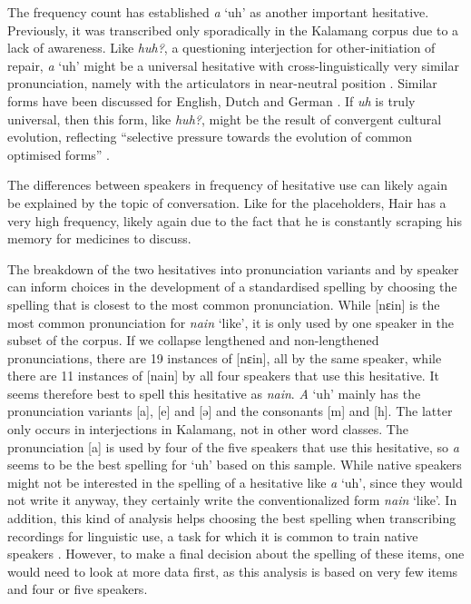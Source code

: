 \documentclass[output=paper,colorlinks,citecolor=brown
\ChapterDOI{10.5281/zenodo.15697587}
]{langscibook}
\begin{document}
The frequency count has established \textit{a} `uh' as another important hesitative. Previously, it was transcribed only sporadically in the Kalamang corpus due to a lack of awareness. Like \textit{huh?}, a questioning interjection for other-initiation of repair, \textit{a} `uh' might be a universal hesitative with cross-linguistically very similar pronunciation, namely with the articulators in near-neutral position \citep{dingemanse2013}. Similar forms have been discussed for English, Dutch and German \citep{clark2002using, leeuw2007hesitation}. If \textit{uh} is truly universal, then this form, like \textit{huh?}, might be the result of convergent cultural evolution, reflecting ``selective pressure towards the evolution of common optimised forms'' \citep[e78273]{dingemanse2013}.

The differences between speakers in frequency of hesitative use can likely again be explained by the topic of conversation. Like for the placeholders, Hair has a very high frequency, likely again due to the fact that he is constantly scraping his memory for medicines to discuss.

The breakdown of the two hesitatives into pronunciation variants and by speaker can inform choices in the development of a standardised spelling by choosing the spelling that is closest to the most common pronunciation. While [nɛin] is the most common pronunciation for \textit{nain} `like', it is only used by one speaker in the subset of the corpus. If we collapse lengthened and non-lengthened pronunciations, there are 19 instances of [nɛin], all by the same speaker, while there are 11 instances of [nain] by all four speakers that use this hesitative. It seems therefore best to spell this hesitative as \textit{nain}. \textit{A} `uh' mainly has the pronunciation variants [a], [e] and [ə] and the consonants [m] and [h]. The latter only occurs in interjections in Kalamang, not in other word classes. The pronunciation [a] is used by four of the five speakers that use this hesitative, so \textit{a} seems to be the best spelling for `uh' based on this sample. While native speakers might not be interested in the spelling of a hesitative like \textit{a} `uh', since they would not write it anyway, they certainly write the conventionalized form \textit{nain} `like'. In addition, this kind of analysis helps choosing the best spelling when transcribing recordings for linguistic use, a task for which it is common to train native speakers \citep[62]{chelliah2013fieldwork}. However, to make a final decision about the spelling of these items, one would need to look at more data first, as this analysis is based on very few items and four or five speakers.
\end{document}

